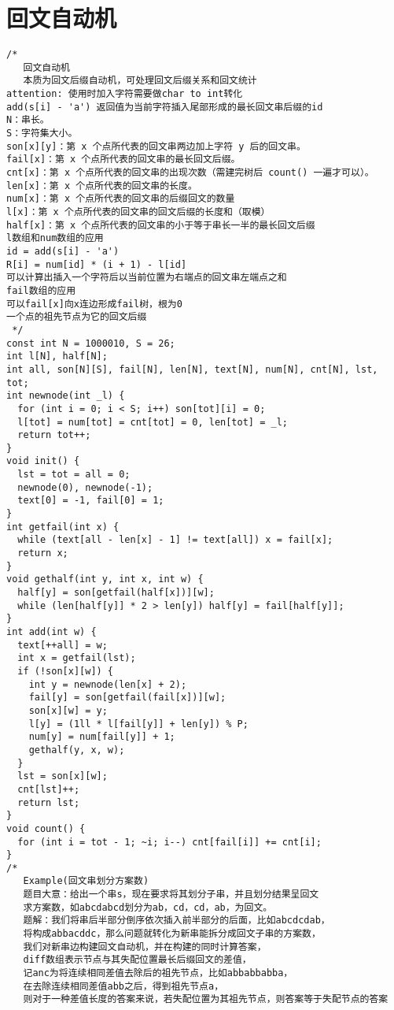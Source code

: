 \section{ 回文自动机}
\begin{lstlisting}
/*
   回文自动机
   本质为回文后缀自动机，可处理回文后缀关系和回文统计
attention: 使用时加入字符需要做char to int转化
add(s[i] - 'a') 返回值为当前字符插入尾部形成的最长回文串后缀的id
N：串长。
S：字符集大小。
son[x][y]：第 x 个点所代表的回文串两边加上字符 y 后的回文串。
fail[x]：第 x 个点所代表的回文串的最长回文后缀。
cnt[x]：第 x 个点所代表的回文串的出现次数（需建完树后 count() 一遍才可以）。
len[x]：第 x 个点所代表的回文串的长度。
num[x]：第 x 个点所代表的回文串的后缀回文的数量
l[x]：第 x 个点所代表的回文串的回文后缀的长度和（取模）
half[x]：第 x 个点所代表的回文串的小于等于串长一半的最长回文后缀
l数组和num数组的应用
id = add(s[i] - 'a')
R[i] = num[id] * (i + 1) - l[id]
可以计算出插入一个字符后以当前位置为右端点的回文串左端点之和
fail数组的应用
可以fail[x]向x连边形成fail树，根为0
一个点的祖先节点为它的回文后缀
 */
const int N = 1000010, S = 26;
int l[N], half[N];
int all, son[N][S], fail[N], len[N], text[N], num[N], cnt[N], lst, tot;
int newnode(int _l) {
  for (int i = 0; i < S; i++) son[tot][i] = 0;
  l[tot] = num[tot] = cnt[tot] = 0, len[tot] = _l;
  return tot++;
}
void init() {
  lst = tot = all = 0;
  newnode(0), newnode(-1);
  text[0] = -1, fail[0] = 1;
}
int getfail(int x) {
  while (text[all - len[x] - 1] != text[all]) x = fail[x];
  return x;
}
void gethalf(int y, int x, int w) {
  half[y] = son[getfail(half[x])][w];
  while (len[half[y]] * 2 > len[y]) half[y] = fail[half[y]];
}
int add(int w) {
  text[++all] = w;
  int x = getfail(lst);
  if (!son[x][w]) {
    int y = newnode(len[x] + 2);
    fail[y] = son[getfail(fail[x])][w];
    son[x][w] = y;
    l[y] = (1ll * l[fail[y]] + len[y]) % P;
    num[y] = num[fail[y]] + 1;
    gethalf(y, x, w);
  }
  lst = son[x][w];
  cnt[lst]++;
  return lst;
}
void count() {
  for (int i = tot - 1; ~i; i--) cnt[fail[i]] += cnt[i];
}
/*
   Example(回文串划分方案数)
   题目大意：给出一个串s，现在要求将其划分子串，并且划分结果呈回文
   求方案数，如abcdabcd划分为ab，cd，cd，ab，为回文。
   题解：我们将串后半部分倒序依次插入前半部分的后面，比如abcdcdab，
   将构成abbacddc，那么问题就转化为新串能拆分成回文子串的方案数，
   我们对新串边构建回文自动机，并在构建的同时计算答案，
   diff数组表示节点与其失配位置最长后缀回文的差值，
   记anc为将连续相同差值去除后的祖先节点，比如abbabbabba，
   在去除连续相同差值abb之后，得到祖先节点a，
   则对于一种差值长度的答案来说，若失配位置为其祖先节点，则答案等于失配节点的答案

\end{lstlisting}
